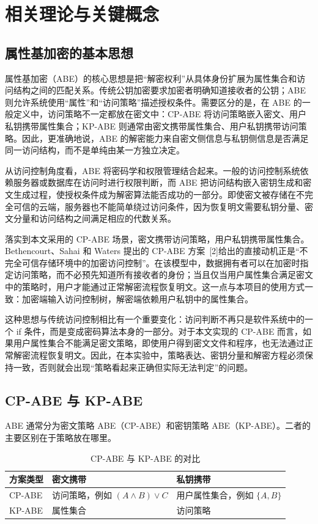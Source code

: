 \chapter{相关理论与关键概念}

\section{属性基加密的基本思想}

属性基加密（ABE）的核心思想是把“解密权利”从具体身份扩展为属性集合和访问结构之间的匹配关系。传统公钥加密要求加密者明确知道接收者的公钥；ABE 则允许系统使用“属性”和“访问策略”描述授权条件。需要区分的是，在 ABE 的一般定义中，访问策略不一定都放在密文中：CP-ABE 将访问策略嵌入密文、用户私钥携带属性集合；KP-ABE 则通常由密文携带属性集合、用户私钥携带访问策略。因此，更准确地说，ABE 的解密能力来自密文侧信息与私钥侧信息是否满足同一访问结构，而不是单纯由某一方独立决定。

从访问控制角度看，ABE 将密码学和权限管理结合起来。一般的访问控制系统依赖服务器或数据库在访问时进行权限判断，而 ABE 把访问结构嵌入密钥生成和密文生成过程，使授权条件成为解密算法能否成功的一部分。即使密文被存储在不完全可信的云端，服务器也不能简单绕过访问条件，因为恢复明文需要私钥分量、密文分量和访问结构之间满足相应的代数关系。

落实到本文采用的 CP-ABE 场景，密文携带访问策略，用户私钥携带属性集合。Bethencourt、Sahai 和 Waters 提出的 CP-ABE 方案~[2]给出的直接动机正是“不完全可信存储环境中的加密访问控制”。在该模型中，数据拥有者可以在加密时指定访问策略，而不必预先知道所有接收者的身份；当且仅当用户属性集合满足密文中的策略时，用户才能通过正常解密流程恢复明文。这一点与本项目的使用方式一致：加密端输入访问控制树，解密端依赖用户私钥中的属性集合。

这种思想与传统访问控制相比有一个重要变化：访问判断不再只是软件系统中的一个 if 条件，而是变成密码算法本身的一部分。对于本文实现的 CP-ABE 而言，如果用户属性集合不能满足密文策略，即使用户得到密文文件和程序，也无法通过正常解密流程恢复明文。因此，在本实验中，策略表达、密钥分量和解密方程必须保持一致，否则就会出现“策略看起来正确但实际无法判定”的问题。

\section{CP-ABE 与 KP-ABE}

ABE 通常分为密文策略 ABE（CP-ABE）和密钥策略 ABE（KP-ABE）。二者的主要区别在于策略放在哪里。

\begin{table}[H]
\centering
\caption{CP-ABE 与 KP-ABE 的对比}
\begin{tabular}{p{} p{} p{}}
\toprule
方案类型 & 密文携带 & 私钥携带 \\
\midrule
CP-ABE & 访问策略，例如 $(A \wedge B)\vee C$ & 用户属性集合，例如 $\{A,B\}$ \\
KP-ABE & 属性集合 & 访问策略 \\
\bottomrule
\end{tabular}
\end{table}

